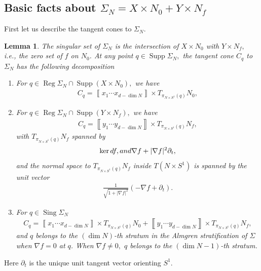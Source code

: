 \documentclass[11pt,a4paper]{amsart}
\numberwithin{equation}{section}
\newcommand{\supp}{\operatorname{Supp}}
\newcommand{\reg}{{\operatorname{Reg}}}
\newcommand{\sing}{{\operatorname{Sing}}}
\newcommand{\Si}{\Sigma}
\newcommand{\cd}{\cdots}
\newcommand{\cu}[1]{\left\llbracket#1\right\rrbracket}
\newcommand{\pd}{\partial}
\newcommand{\na}{\nabla}
\theoremstyle{plain}
\newtheorem{lem}[exam]{Lemma}
\theoremstyle{definition}
\numberwithin{equation}{subsection}
\begin{document}
\subsection{Basic facts about  $\Si_N=X\times N_0+Y\times N_f$}\label{techlem}
First let us describe the tangent cones to $\Si_N.$
\begin{lem}
The singular set of $\Si_N$ is the intersection of $X\times N_0$ with $Y\times N_f,$ i.e., the zero set of $f$ on $N_0$.  At any point $q\in\supp \Si_N,$  the tangent cone $C_q$ to $\Si_N$ has the following decomposition
\begin{enumerate}
\item For $q\in \reg \Si_N\cap \supp( X\times N_0),$ we have
\begin{align}\label{cpx}
C_q=\cu{x_1\cd x_{d-\dim N}}\times T_{\pi_{N\times S^1}(q)}N_0,
\end{align}
\item For $q\in \reg \Si_N\cap \supp (Y\times N_f),$ we have
\begin{align}\label{cpy}
C_q=\cu{y_1\cd y_{d-\dim N}}\times T_{\pi_{N\times S^1}(q)}N_f,
\end{align}
with $T_{\pi_{N\times S^1}(q)}N_f$ spanned by
\begin{align}\label{knf}
\ker df,\textnormal{and }\na f+|\na f|^2\pd_t,
\end{align}
and the normal space to $T_{\pi_{N\times S^1}(q)}N_f$ inside $T(N\times S^1)$ is spanned by the unit vector
\begin{align}\label{pnf}
\frac{1}{\sqrt{1+|\na f|^2}}(-\na f+\pd_t).
\end{align}
\item For $q\in \sing \Si_N$
\begin{align}\label{cps}
C_q=\cu{x_1\cd x_{d-\dim N}}\times T_{\pi_{N\times S^1}(q)}N_0+\cu{y_1\cd y_{d-\dim N}}\times T_{\pi_{N\times S^1}(q)}N_f,
\end{align}and $q$ belongs to the $(\dim N)$-th stratum in the Almgren stratification of $\Si$ when $\na f=0$ at $q$. When $\na f\not=0,$ $q$ belongs to the $(\dim N-1)$-th stratum.
\end{enumerate} 
\end{lem}
Here $\pd_t$ is the unique unit tangent vector orienting $S^1.$ %
\end{document}
